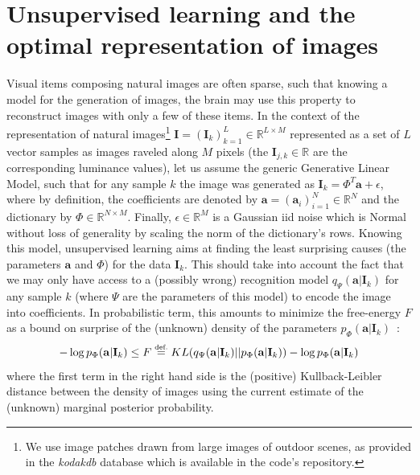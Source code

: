 \documentclass[a4paper, 11pt, draft]{article} %
\newcommand{\coef}{\mathbf{a}} %
\newcommand{\image}{\mathbf{I}} %
\newcommand{\dico}{\Phi} %
\newcommand{\eqdef}{\ensuremath{\stackrel{\mbox{\upshape\tiny def.}}{=}}}
\newcommand{\RR}{\mathbb{R}}
\begin{document}
\section{Unsupervised learning and the optimal representation of images}%
%
Visual items composing natural images are often sparse, such that knowing a model for the generation of images, the brain may use this property to reconstruct images with only a few of these items.
In the context of the representation of natural images\footnote{We use image patches drawn from large images of outdoor scenes, as provided in the \emph{kodakdb} database which is available in the code's repository.} $\image = (\image_k)_{k=1}^L \in \RR^{L \times M}$ represented as a set of $L$ vector samples as images raveled along $M$ pixels (the $\image_{j, k} \in \RR$ are the corresponding luminance values), let us assume the generic Generative Linear Model, such that for any sample $k$ the image was generated as $\image_k = \dico^T \coef + \epsilon $, where by definition, the coefficients are denoted by $\coef = (\coef_i)_{i=1}^N \in \RR^{N}$ and the dictionary by $\dico \in \RR^{N \times M}$. Finally, $\epsilon \in \RR^{M}$ is a Gaussian iid noise which is Normal without loss of generality by scaling the norm of the dictionary's rows. Knowing this model, unsupervised learning aims at finding the least surprising causes (the parameters $\coef$ and $\dico$) for the data $\image_k$. This should take into account the fact that we may only have access to a (possibly wrong) recognition model $q_\Psi(\coef | \image_k)$ for any sample $k$ (where $\Psi$ are the parameters of this model) to encode the image into coefficients. In probabilistic term, this amounts to minimize the free-energy $F$ as a bound on surprise of the (unknown) density of the parameters $p_\dico( \coef | \image_k)$~\citep{Friston12,Kingma13,Doersch2016}:
\begin{equation} -\log p_\dico( \coef | \image_k) \leq F \eqdef KL( q_\Psi(\coef | \image_k) || p_\dico( \coef | \image_k) )  -\log p_\dico( \coef | \image_k) \end{equation}
where the first term in the right hand side is the (positive) Kullback-Leibler distance between the density of images using the current estimate of the (unknown) marginal posterior probability.
\end{document}
